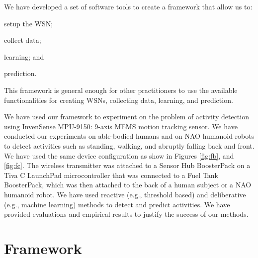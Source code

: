 \documentclass[letterpaper]{article}
\begin{document}
\begin{sloppy}
We have developed a set of software tools to create a framework that allow us to: 
\begin{inparaenum}[1)] \item setup the WSN; \item collect data; \item learning; and \item 
prediction. \end{inparaenum} This framework is general enough for other practitioners to use the
available functionalities for creating WSNs, collecting data, learning, and prediction.



We have used our framework to experiment on the problem of activity detection using InvenSense 
MPU-9150: 9-axis MEMS motion tracking sensor. We have conducted our experiments on able-bodied 
humans and on NAO humanoid robots to detect activities such as standing, walking, and abruptly 
falling back and front. We have used the same device configuration as show in Figures \ref{fig:fb}, 
and \ref{fig:fc}. The wireless transmitter was attached to a Sensor Hub BoosterPack on a Tiva C 
LaunchPad microcontroller that was connected to a Fuel Tank BoosterPack, which was then attached to 
the back of a human subject or a NAO humanoid robot. We have used reactive (e.g., threshold based) 
and deliberative (e.g., machine learning) methods to detect and predict activities. We have 
provided  evaluations and empirical results to  justify the success of our methods. 


\section{Framework}


\end{sloppy}
\end{document}

